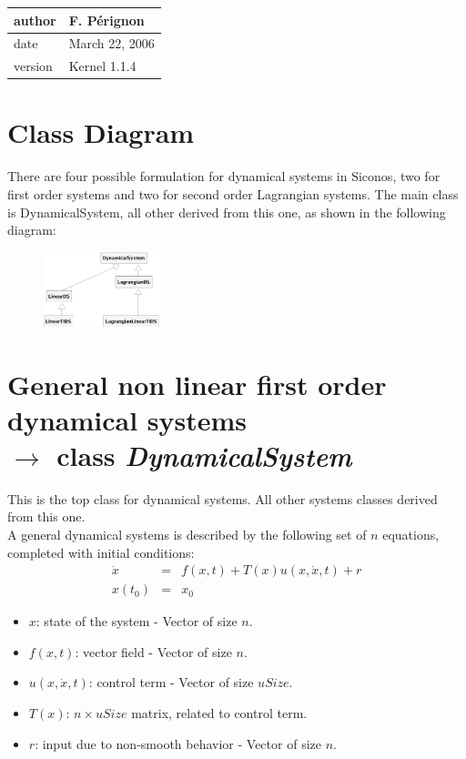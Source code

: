 \documentclass[10pt]{report}
\begin{document}
\begin{table}[!ht]
  \begin{tabular}{|l|l|}
    \hline
    author  & F. P\'erignon \\
    \hline
    date    & March 22, 2006 \\ 
    \hline
    version & Kernel 1.1.4 \\
    \hline
  \end{tabular}
\end{table}


\section{Class Diagram}
There are four possible formulation for dynamical systems in Siconos,
two for first order systems and two for second order Lagrangian systems. The main class is DynamicalSystem, all other derived from this one, as shown in the following diagram:
\begin{figure}[htbp]
  \centering
 \includegraphics[width=0.3\textwidth]{./DSClassDiagram.eps}
  \label{DSDiagram}
\end{figure}
\section{General non linear first order dynamical systems \\ $\rightarrow$ class \it{DynamicalSystem}}
This is the top class for dynamical systems. All other systems classes derived from this one. \\

A general dynamical systems is described by the following set of $n$ equations, completed with initial conditions:
\begin{eqnarray}
  \dot x &=& f(x,t) + T(x) u(x, \dot x, t) + r \\
  x(t_0)&=&x_0 
\end{eqnarray}

\begin{itemize}
\item $x$: state of the system - Vector of size $n$.
\item $f(x,t)$: vector field - Vector of size $n$.
\item $u(x, \dot x, t)$: control term - Vector of size $uSize$.
\item $T(x)$: $n\times uSize$ matrix, related to control term.
\item $r$: input due to non-smooth behavior - Vector of size $n$.
\end{itemize}
\end{document}
